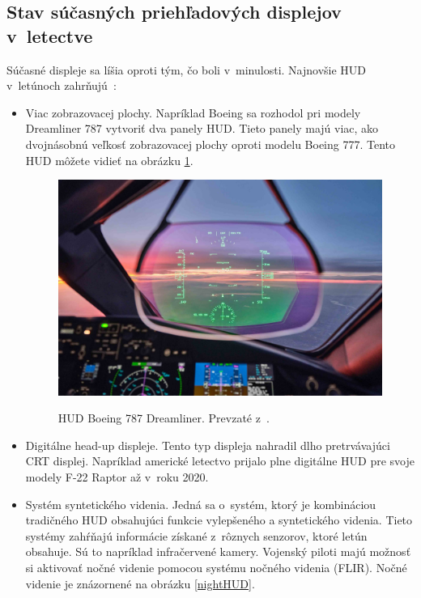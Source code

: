 \subsection{Stav súčasných priehľadových displejov v~letectve}
Súčasné displeje sa líšia oproti tým, čo boli v~minulosti. Najnovšie HUD v~letúnoch zahrňujú~\cite{HUDnight}:
\begin{itemize}
    \item Viac zobrazovacej plochy. Napríklad Boeing sa rozhodol pri modely Dreamliner 787 vytvoriť dva panely HUD. Tieto panely majú viac, ako dvojnásobnú veľkosť zobrazovacej plochy oproti modelu Boeing 777. Tento HUD môžete vidieť na obrázku \ref{787hud}.
    \begin{figure}[ht]
\centering
\includegraphics[scale=0.12]{obrazky-figures/787HUD.jpg}
\caption{HUD Boeing 787 Dreamliner\texttrademark{}. Prevzaté z~\cite{fotoB787}.}{\label{787hud}}
\end{figure}
    \item Digitálne head-up displeje. Tento typ displeja nahradil dlho pretrvávajúci CRT displej. Napríklad americké letectvo prijalo plne digitálne HUD pre svoje modely F-22 Raptor až v~roku 2020.
    \item Systém syntetického videnia. Jedná sa o~systém, ktorý je kombináciou tradičného HUD obsahujúci funkcie vylepšeného a syntetického videnia. Tieto systémy zahŕňajú informácie získané z~rôznych senzorov, ktoré letún obsahuje. Sú to napríklad infračervené kamery. Vojenský piloti majú možnosť si aktivovať nočné videnie pomocou systému nočného videnia (FLIR). Nočné videnie je znázornené na obrázku \ref{nightHUD}.
    \begin{figure}[ht]
\centering

\end{figure}
\end{itemize}
